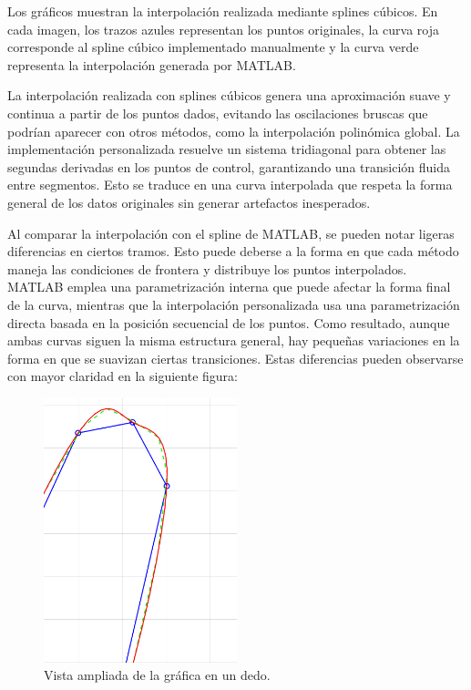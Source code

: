 \begin{homeworkProblem}
\begin{solucion}
Los gráficos muestran la interpolación realizada mediante splines cúbicos. En cada imagen, los trazos azules representan los puntos originales, la curva roja corresponde al spline cúbico implementado manualmente y la curva verde representa la interpolación generada por MATLAB.

La interpolación realizada con splines cúbicos genera una aproximación suave y continua a partir de los puntos dados, evitando las oscilaciones bruscas que podrían aparecer con otros métodos, como la interpolación polinómica global. La implementación personalizada resuelve un sistema tridiagonal para obtener las segundas derivadas en los puntos de control, garantizando una transición fluida entre segmentos. Esto se traduce en una curva interpolada que respeta la forma general de los datos originales sin generar artefactos inesperados.  

Al comparar la interpolación con el spline de MATLAB, se pueden notar ligeras diferencias en ciertos tramos. Esto puede deberse a la forma en que cada método maneja las condiciones de frontera y distribuye los puntos interpolados. MATLAB emplea una parametrización interna que puede afectar la forma final de la curva, mientras que la interpolación personalizada usa una parametrización directa basada en la posición secuencial de los puntos. Como resultado, aunque ambas curvas siguen la misma estructura general, hay pequeñas variaciones en la forma en que se suavizan ciertas transiciones. Estas diferencias pueden observarse con mayor claridad en la siguiente figura:  

\begin{figure}[H] %
    \centering
    \includegraphics[width=0.5\textwidth]{Figures/pulgar.png} %
    \caption{Vista ampliada de la gráfica en un dedo.}
    \label{fig:detalle_dedo}
\end{figure}  


\end{solucion}
\end{homeworkProblem}
